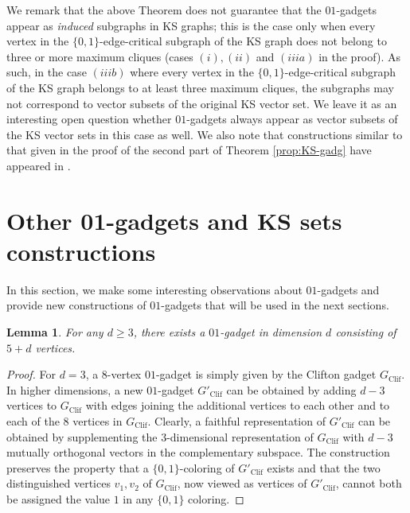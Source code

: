 \documentclass[twocolumn, a4paper, superscriptaddress,nofootinbib, accepted=2020-08-07, hyperref]{quantumarticle}
\newtheorem{lemma}{Lemma}
\begin{document}
We remark that the above Theorem does not guarantee that the $01$-gadgets appear as \textit{induced} subgraphs in KS graphs; this is the case only when every vertex in the $\{0,1\}$-edge-critical subgraph of the KS graph does not belong to three or more maximum cliques (cases $(i), (ii)$ and $(iii a)$ in the proof). As such, in the case $(iii b)$ where every vertex in the $\{0,1\}$-edge-critical subgraph of the KS graph belongs to at least three maximum cliques, the subgraphs may not correspond to vector subsets of the original KS vector set. We leave it as an interesting open question whether $01$-gadgets always appear as vector subsets of the KS vector sets in this case as well. We also note that constructions similar to that given in the proof of the second part of Theorem \ref{prop:KS-gadg} have appeared in \cite{BBCP09}. 








\section{Other 01-gadgets and KS sets constructions}\label{sec:constr}
In this section, we make some interesting observations about $01$-gadgets and provide new constructions of $01$-gadgets that will be used in the next sections. 

\begin{lemma}
	\label{lem:min-gad}
	For any $d\geq 3$, there exists a $01$-gadget in dimension $d$ consisting of $5+d$ vertices.    
\end{lemma}
\begin{proof}
For $d=3$, a 8-vertex $01$-gadget is simply given by the Clifton gadget $G_{\text{Clif}}$. In higher dimensions, a new $01$-gadget $G'_{\text{Clif}}$ can be obtained by adding $d-3$ vertices to $G_{\text{Clif}}$ with edges joining the additional vertices to each other and to each of the $8$ vertices in $G_{\text{Clif}}$. Clearly, a faithful representation of $G'_{\text{Clif}}$ can be obtained by supplementing the $3$-dimensional representation of $G_{\text{Clif}}$ with $d-3$ mutually orthogonal vectors in the complementary subspace. The construction preserves the property that a $\{0,1\}$-coloring of $G'_{\text{Clif}}$ exists and that the two distinguished vertices $v_1,v_2$ of $G_{\text{Clif}}$, now viewed 	as vertices of $G'_{\text{Clif}}$, cannot both be assigned the value $1$ in any $\{0,1\}$ coloring. 
\end{proof}
\end{document}
